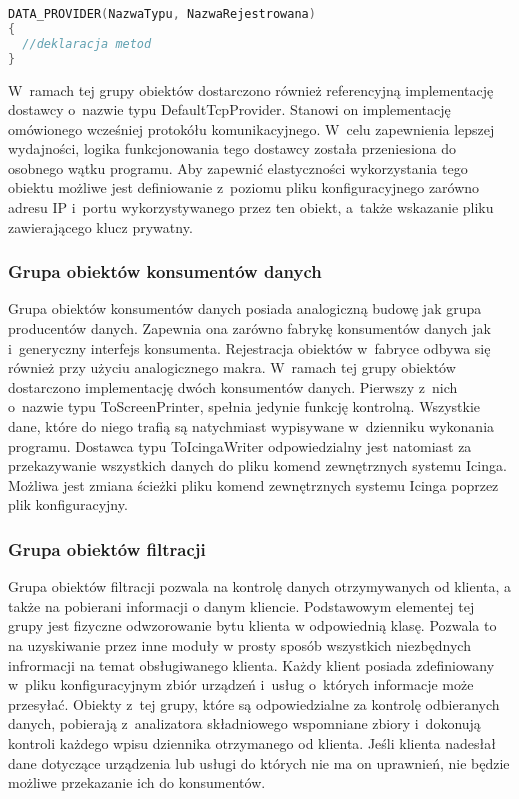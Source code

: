 \vspace{0.5cm}
\begin{minipage}{\textwidth}
\begin{lstlisting}[language=c++, caption=Definicja dostawcy danych, linewidth=10cm]
DATA_PROVIDER(NazwaTypu, NazwaRejestrowana)
{
  //deklaracja metod
}
\end{lstlisting}
\end{minipage}
\vspace{0.5cm}

W~ramach tej grupy obiektów dostarczono również referencyjną
implementację dostawcy o~nazwie typu DefaultTcpProvider. Stanowi on
implementację omówionego wcześniej protokółu komunikacyjnego. W~celu
zapewnienia lepszej wydajności, logika funkcjonowania tego dostawcy
została przeniesiona do osobnego wątku programu. Aby zapewnić
elastyczności wykorzystania tego obiektu możliwe jest definiowanie
z~poziomu pliku konfiguracyjnego zarówno adresu IP i~portu
wykorzystywanego przez ten obiekt, a~także wskazanie pliku
zawierającego klucz prywatny.

\subsubsection[Grupa obiektów konsumentów danych][Grupa obiektów
konsumentów danych]{Grupa obiektów konsumentów danych}

Grupa obiektów konsumentów danych posiada analogiczną budowę jak grupa
producentów danych. Zapewnia ona zarówno fabrykę konsumentów danych
jak i~generyczny interfejs konsumenta. Rejestracja obiektów w~fabryce
odbywa się również przy użyciu analogicznego makra. W~ramach tej grupy
obiektów dostarczono implementację dwóch konsumentów danych. Pierwszy
z~nich o~nazwie typu ToScreenPrinter, spełnia jedynie funkcję
kontrolną. Wszystkie dane, które do niego trafią są natychmiast
wypisywane w~dzienniku wykonania programu. Dostawca typu
ToIcingaWriter odpowiedzialny jest natomiast za przekazywanie
wszystkich danych do pliku komend zewnętrznych systemu Icinga. Możliwa
jest zmiana ścieżki pliku komend zewnętrznych systemu Icinga poprzez
plik konfiguracyjny.

\subsubsection[Grupa obiektów filtracji][Grupa obiektów
filtracji]{Grupa obiektów filtracji}

Grupa obiektów filtracji pozwala na kontrolę danych otrzymywanych od
klienta, a także na pobierani informacji o danym kliencie. Podstawowym
elementej tej grupy jest fizyczne odwzorowanie bytu klienta w
odpowiednią klasę. Pozwala to na uzyskiwanie przez inne moduły w
prosty sposób wszystkich niezbędnych infrormacji na temat
obsługiwanego klienta. Każdy klient posiada zdefiniowany w~pliku
konfiguracyjnym zbiór urządzeń i~usług o~których informacje może
przesyłać. Obiekty z~tej grupy, które są odpowiedzialne za kontrolę
odbieranych danych, pobierają z~analizatora składniowego wspomniane
zbiory i~dokonują kontroli każdego wpisu dziennika otrzymanego od
klienta. Jeśli klienta nadesłał dane dotyczące urządzenia lub usługi
do których nie ma on uprawnień, nie będzie możliwe przekazanie ich do
konsumentów.

